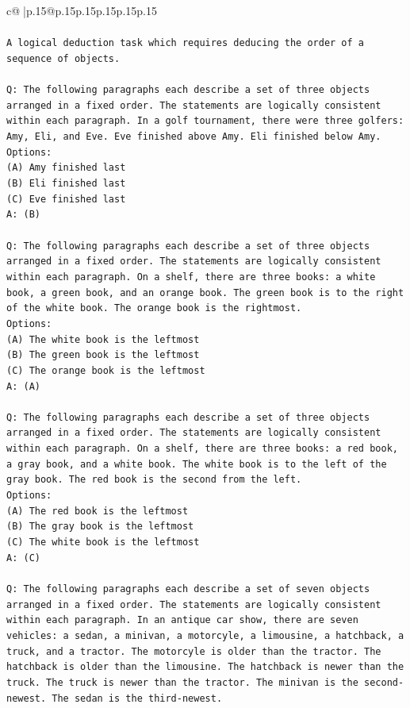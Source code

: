 \documentclass{article}
\begin{document}
{\begin{supertabular}{c@{$\;$}|p{.15\linewidth}@{}p{.15\linewidth}p{.15\linewidth}p{.15\linewidth}p{.15\linewidth}p{.15\linewidth}}
{{{\\ 
\\ 
\texttt{A logical deduction task which requires deducing the order of a sequence of objects.} \\
\\ 
\texttt{Q: The following paragraphs each describe a set of three objects arranged in a fixed order. The statements are logically consistent within each paragraph. In a golf tournament, there were three golfers: Amy, Eli, and Eve. Eve finished above Amy. Eli finished below Amy.} \\
\texttt{Options:} \\
\texttt{(A) Amy finished last} \\
\texttt{(B) Eli finished last} \\
\texttt{(C) Eve finished last} \\
\texttt{A: (B)} \\
\\ 
\texttt{Q: The following paragraphs each describe a set of three objects arranged in a fixed order. The statements are logically consistent within each paragraph. On a shelf, there are three books: a white book, a green book, and an orange book. The green book is to the right of the white book. The orange book is the rightmost.} \\
\texttt{Options:} \\
\texttt{(A) The white book is the leftmost} \\
\texttt{(B) The green book is the leftmost} \\
\texttt{(C) The orange book is the leftmost} \\
\texttt{A: (A)} \\
\\ 
\texttt{Q: The following paragraphs each describe a set of three objects arranged in a fixed order. The statements are logically consistent within each paragraph. On a shelf, there are three books: a red book, a gray book, and a white book. The white book is to the left of the gray book. The red book is the second from the left.} \\
\texttt{Options:} \\
\texttt{(A) The red book is the leftmost} \\
\texttt{(B) The gray book is the leftmost} \\
\texttt{(C) The white book is the leftmost} \\
\texttt{A: (C)} \\
\\ 
\texttt{Q: The following paragraphs each describe a set of seven objects arranged in a fixed order. The statements are logically consistent within each paragraph. In an antique car show, there are seven vehicles: a sedan, a minivan, a motorcyle, a limousine, a hatchback, a truck, and a tractor. The motorcyle is older than the tractor. The hatchback is older than the limousine. The hatchback is newer than the truck. The truck is newer than the tractor. The minivan is the second{-}newest. The sedan is the third{-}newest.} \\
}}}
\end{supertabular}}
\end{document}
